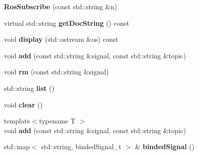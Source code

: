 \begin{DoxyCompactItemize}
\item 
\mbox{\label{classdynamic__graph_1_1RosSubscribe_ae0e13e1ae910901aed4aa3875c4cc6f8}} 
{\bfseries Ros\+Subscribe} (const std\+::string \&n)
\item 
\mbox{\label{classdynamic__graph_1_1RosSubscribe_a897d4b63a67fec3cb821e73697146f6b}} 
virtual std\+::string {\bfseries get\+Doc\+String} () const
\item 
\mbox{\label{classdynamic__graph_1_1RosSubscribe_a1aee8c0b5c13de87d42af03341fcd250}} 
void {\bfseries display} (std\+::ostream \&os) const
\item 
\mbox{\label{classdynamic__graph_1_1RosSubscribe_a5ea4e0b7da520ce291a1814935b25d50}} 
void {\bfseries add} (const std\+::string \&signal, const std\+::string \&topic)
\item 
\mbox{\label{classdynamic__graph_1_1RosSubscribe_a21d955435830639a8c02c4ef33c49849}} 
void {\bfseries rm} (const std\+::string \&signal)
\item 
\mbox{\label{classdynamic__graph_1_1RosSubscribe_a863629270bc4c682b45f41471f858e8c}} 
std\+::string {\bfseries list} ()
\item 
\mbox{\label{classdynamic__graph_1_1RosSubscribe_a33d08228f31cef91c35f83fee6f30bdc}} 
void {\bfseries clear} ()
\item 
\mbox{\label{classdynamic__graph_1_1RosSubscribe_a4b19a0b90769381dd89c90a611fc0cbb}} 
{\footnotesize template$<$typename T $>$ }\\void {\bfseries add} (const std\+::string \&signal, const std\+::string \&topic)
\item 
\mbox{\label{classdynamic__graph_1_1RosSubscribe_a09004dab7209ce50d235295fa7c7ec0d}} 
std\+::map$<$ std\+::string, binded\+Signal\+\_\+t $>$ \& {\bfseries binded\+Signal} ()

\end{DoxyCompactItemize}
